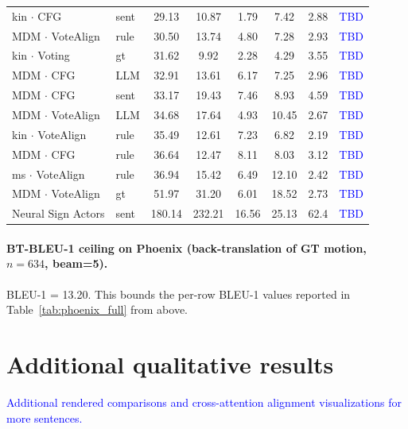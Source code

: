 \documentclass{article}
\newcommand{\placeholder}[1]{\textcolor{blue}{#1}}
\begin{document}
\begin{table}[h]
\begin{tabular}{llcccccc}
    kin $\cdot$ CFG          & sent      & 29.13          & 10.87         & 1.79          & 7.42          & 2.88          & \placeholder{TBD} \\
    MDM $\cdot$ VoteAlign & rule      & 30.50          & 13.74         & 4.80          & 7.28          & 2.93          & \placeholder{TBD} \\
    kin $\cdot$ Voting       & gt        & 31.62          & 9.92          & 2.28          & 4.29          & 3.55          & \placeholder{TBD} \\
    MDM $\cdot$ CFG          & LLM       & 32.91          & 13.61         & 6.17          & 7.25          & 2.96          & \placeholder{TBD} \\
    MDM $\cdot$ CFG          & sent      & 33.17          & 19.43         & 7.46          & 8.93          & 4.59          & \placeholder{TBD} \\
    MDM $\cdot$ VoteAlign & LLM       & 34.68          & 17.64         & 4.93          & 10.45         & 2.67          & \placeholder{TBD} \\
    kin $\cdot$ VoteAlign & rule      & 35.49          & 12.61         & 7.23          & 6.82          & 2.19          & \placeholder{TBD} \\
    MDM $\cdot$ CFG          & rule      & 36.64          & 12.47         & 8.11          & 8.03          & 3.12          & \placeholder{TBD} \\
    ms $\cdot$ VoteAlign  & rule      & 36.94          & 15.42         & 6.49          & 12.10         & 2.42          & \placeholder{TBD} \\
    MDM $\cdot$ VoteAlign & gt        & 51.97          & 31.20         & 6.01          & 18.52         & 2.73          & \placeholder{TBD} \\
    \midrule
    Neural Sign Actors       & sent & 180.14 & 232.21 & 16.56 & 25.13 & 62.4 & \placeholder{TBD} \\
    \bottomrule
  \end{tabular}
\end{table}

\paragraph{BT-BLEU-1 ceiling on Phoenix (back-translation of GT motion, $n=634$, beam=5).}
BLEU-1 = 13.20.
This bounds the per-row BLEU-1 values reported in Table~\ref{tab:phoenix_full} from above.

\section{Additional qualitative results}
\label{app:qualitative}

\placeholder{Additional rendered comparisons and cross-attention alignment visualizations for more sentences.}


\newpage

\end{document}
